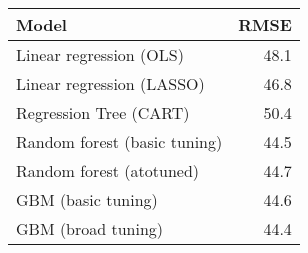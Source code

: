 
\begin{tabular}{lr}
\toprule
 Model & RMSE\\
\midrule
Linear regression (OLS) & 48.1\\
Linear regression (LASSO) & 46.8\\
Regression Tree (CART) & 50.4\\
Random forest (basic tuning) & 44.5\\
Random forest (atotuned) & 44.7\\
GBM (basic tuning) & 44.6\\
GBM (broad tuning) & 44.4\\
\bottomrule
\end{tabular}
